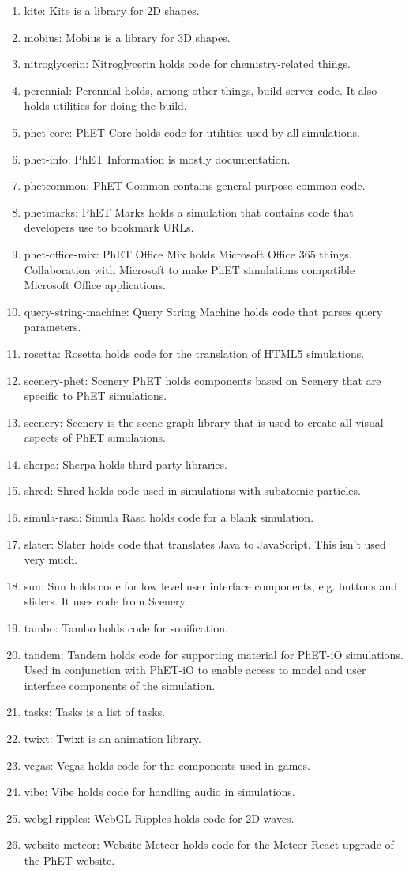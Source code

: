 \documentclass[titlepage]{article}
\begin{document}
\begin{enumerate}
			\item kite: Kite is a library for 2D shapes.
			\item mobius: Mobius is a library for 3D shapes.
			\item nitroglycerin: Nitroglycerin holds code for chemistry-related things.
			\item perennial: Perennial holds, among other things, build server code. It also holds utilities for doing the build.
			\item phet-core: PhET Core holds code for utilities used by all simulations.
			\item phet-info: PhET Information is mostly documentation.
			\item phetcommon: PhET Common contains general purpose common code.
			\item phetmarks: PhET Marks holds a simulation that contains code that developers use to bookmark URLs.
			\item phet-office-mix: PhET Office Mix holds Microsoft Office 365 things. Collaboration with Microsoft to make PhET simulations compatible Microsoft Office applications.
			\item query-string-machine: Query String Machine holds code that parses query parameters.
			\item rosetta: Rosetta holds code for the translation of HTML5 simulations.
			\item scenery-phet: Scenery PhET holds components based on Scenery that are specific to PhET simulations.
			\item scenery: Scenery is the scene graph library that is used to create all visual aspects of PhET simulations.
			\item sherpa: Sherpa holds third party libraries.
			\item shred: Shred holds code used in simulations with subatomic particles.
			\item simula-rasa: Simula Rasa holds code for a blank simulation.
			\item slater: Slater holds code that translates Java to JavaScript. This isn't used very much.
			\item sun: Sun holds code for low level user interface components, e.g. buttons and sliders. It uses code from Scenery.
			\item tambo: Tambo holds code for sonification.
			\item tandem: Tandem holds code for supporting material for PhET-iO simulations. Used in conjunction with PhET-iO to enable access to model and user interface components of the simulation.
			\item tasks: Tasks is a list of tasks.
			\item twixt: Twixt is an animation library. 
			\item vegas: Vegas holds code for the components used in games.
			\item vibe: Vibe holds code for handling audio in simulations.
			\item webgl-ripples: WebGL Ripples holds code for 2D waves.
			\item website-meteor: Website Meteor holds code for the Meteor-React upgrade of the PhET website.
		\end{enumerate}
\end{document}
